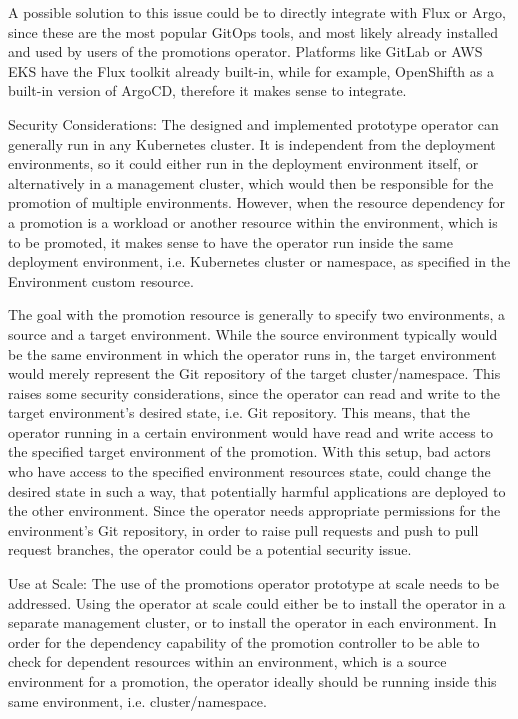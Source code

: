 A possible solution to this issue could be to directly integrate with Flux or Argo, since these are the most popular GitOps tools, and most likely already installed and used by users of the promotions operator.
Platforms like GitLab or AWS EKS have the Flux toolkit already built-in,
while for example, OpenShifth as a built-in version of ArgoCD,
therefore it makes sense to integrate.

Security Considerations:
The designed and implemented prototype operator can generally run in any Kubernetes cluster.
It is independent from the deployment environments, so it could either run in the deployment environment itself,
or alternatively in a management cluster, which would then be responsible for the promotion of multiple environments.
However, when the resource dependency for a promotion is a workload or another resource within the environment,
which is to be promoted, it makes sense to have the operator run inside the same deployment environment, i.e. Kubernetes cluster or namespace, as specified in the Environment custom resource.

The goal with the promotion resource is generally to specify two environments,
a source and a target environment.
While the source environment typically would be the same environment in which the operator runs in,
the target environment would merely represent the Git repository of the target cluster/namespace.
This raises some security considerations,
since the operator can read and write to the target environment's desired state, i.e. Git repository.
This means, that the operator running in a certain environment would have read and write access
to the specified target environment of the promotion.
With this setup, bad actors who have access to the specified environment resources state,
could change the desired state in such a way, that
potentially harmful applications are deployed to the other environment.
Since the operator needs appropriate permissions for the environment's Git repository,
in order to raise pull requests and push to pull request branches, the operator could
be a potential security issue.

Use at Scale:
The use of the promotions operator prototype at scale needs to be addressed.
Using the operator at scale could either be to install the operator in a separate management cluster,
or to install the operator in each environment.
In order for the dependency capability of the promotion controller
to be able to check for dependent resources within an environment,
which is a source environment for a promotion,
the operator ideally should be running inside this same environment, i.e. cluster/namespace.


